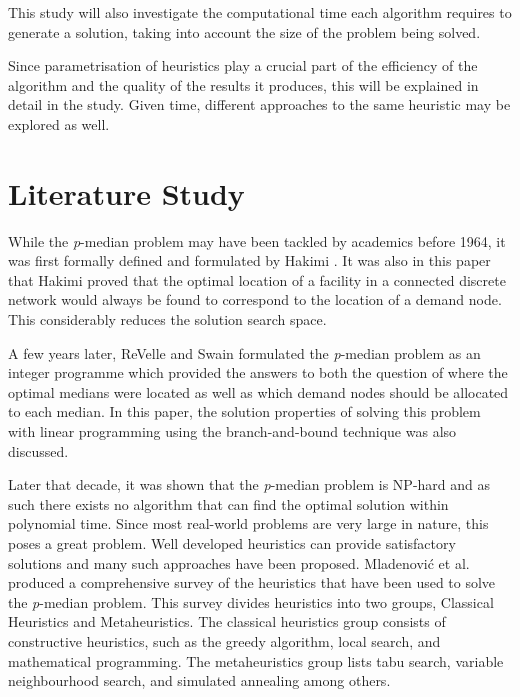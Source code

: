 \documentclass[11pt]{article}
\begin{document}
	This study will also investigate the computational time each algorithm requires to generate a solution, taking into account the size of the problem being solved.
	
	Since parametrisation of heuristics play a crucial part of the efficiency of the algorithm and the quality of the results it produces, this will be explained in detail in the study.  Given time, different approaches to the same heuristic may be explored as well.	
	
	
	\section{Literature Study} \label{lit.study}
	While the \emph{p}-median problem may have been tackled by academics before 1964, it was first formally defined and formulated by Hakimi \cite{HAKI64}.  It was also in this paper that Hakimi proved that the optimal location of a facility in a connected discrete network would always be found to correspond to the location of a demand node.  This considerably reduces the solution search space.
	
	A few years later, ReVelle and Swain \cite{REVE70} formulated the \emph{p}-median problem as an integer programme  which provided the answers to both the question of where the optimal medians were located as well as which demand nodes should be allocated to each median.  In this paper, the solution properties of solving this problem with linear programming  using the branch-and-bound technique  was also discussed.
	
	Later that decade, it was shown that the \emph{p}-median problem is NP-hard  and as such there exists no algorithm that can find the optimal solution within polynomial time.  Since most real-world problems are very large in nature, this poses a great problem.  Well developed heuristics can provide satisfactory solutions and many such approaches have been proposed.  Mladenovi\'{c} et al. \cite{MLAD07} produced a comprehensive survey of the heuristics that have been used to solve the \emph{p}-median problem.  This survey divides heuristics into two groups, Classical Heuristics and Metaheuristics.  The classical heuristics group consists of constructive heuristics, such as the greedy algorithm, local search, and mathematical programming.  The metaheuristics group lists tabu search, variable neighbourhood search, and simulated annealing among others.
	
\end{document}
